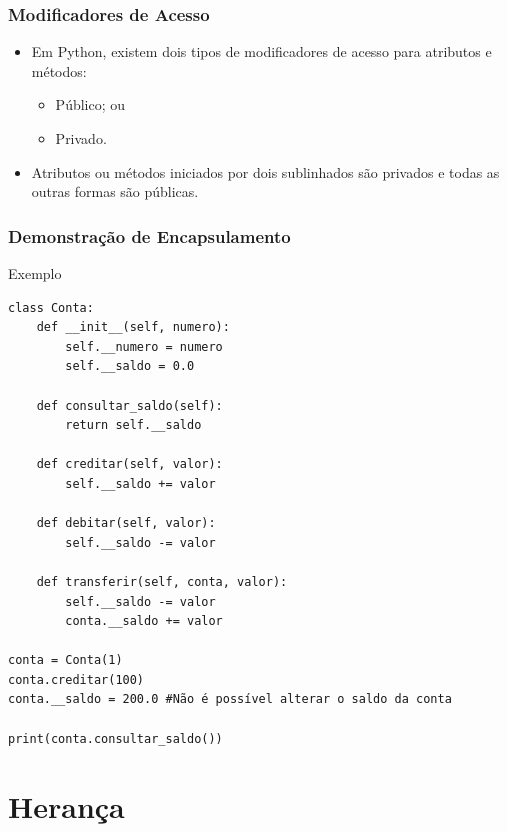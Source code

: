 \documentclass{beamer}
\begin{document}
\begin{frame}
	\frametitle{Modificadores de Acesso}
	
	\begin{itemize}
	  \item Em Python, existem dois tipos de modificadores de acesso para atributos
	  e métodos:
	  \begin{itemize}
	    \item Público; ou
	    \item Privado.
	  \end{itemize}
	  \item Atributos ou métodos iniciados por dois sublinhados são privados e
	  todas as outras formas são públicas.
	\end{itemize}
\end{frame}

\begin{frame}[fragile]
	\frametitle{Demonstração de Encapsulamento}
	
	\begin{exampleblock}{Exemplo}
		\begin{lstlisting}
class Conta:
    def __init__(self, numero):
        self.__numero = numero
        self.__saldo = 0.0

    def consultar_saldo(self):
        return self.__saldo

    def creditar(self, valor):
        self.__saldo += valor

    def debitar(self, valor):
        self.__saldo -= valor

    def transferir(self, conta, valor):
        self.__saldo -= valor
        conta.__saldo += valor

conta = Conta(1)
conta.creditar(100)
conta.__saldo = 200.0 #Não é possível alterar o saldo da conta

print(conta.consultar_saldo())
        \end{lstlisting}
	\end{exampleblock}
\end{frame}

\section{Herança}
\end{document}
